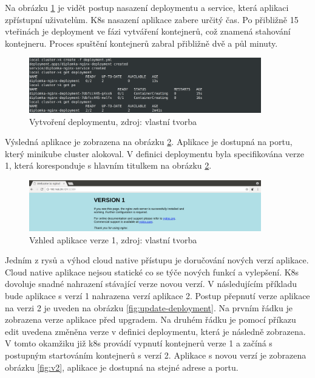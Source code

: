 Na obrázku \ref{fig:create-deployment} je vidět postup nasazení deploymentu a service, která aplikaci zpřístupní uživatelům. K8s nasazení aplikace zabere určitý čas. Po přibližně 15 vteřinách je deployment ve fázi vytváření kontejnerů, což znamená stahování kontejneru. Proces spuštění kontejnerů zabral přibližně dvě a půl minuty. 


\begin{figure}[H]
  \begin{centering}
    
	  \includegraphics[width=0.9\textwidth]{images/create-deployment.png}
    \par
	  \caption{Vytvoření deploymentu\label{fig:create-deployment}, zdroj: vlastní tvorba}
    \end{centering}
\end{figure}

Výsledná aplikace je zobrazena na obrázku \ref{fig:v1}. Aplikace je dostupná na portu, který minikube cluster alokoval. V definici deploymentu byla specifikována verze 1, která koresponduje s hlavním titulkem na obrázku \ref{fig:v1}.

\begin{figure}[H]
  \begin{centering}
    
	  \includegraphics[width=0.9\textwidth]{images/v1.png}
    \par
	  \caption{Vzhled aplikace verze 1\label{fig:v1}, zdroj: vlastní tvorba}
    \end{centering}
\end{figure}

Jedním z rysů a výhod cloud native přístupu je doručování nových verzí aplikace. Cloud native aplikace nejsou statické co se týče nových funkcí a vylepšení. K8s dovoluje snadné nahrazení stávající verze novou verzí. V následujícím příkladu bude aplikace \linebreak s verzí 1 nahrazena verzí aplikace 2. Postup přepnutí verze aplikace na verzi 2 je uveden na obrázku \ref{fig:update-deployment}. Na prvním řádku je zobrazena verze aplikace před upgradem. \linebreak Na druhém řádku je pomocí příkazu edit uvedena změněna verze v definici deploymentu, která je následně zobrazena. V tomto okamžiku již k8s provádí vypnutí kontejnerů verze 1 a začíná s postupným startováním kontejnerů s verzí 2. Aplikace s novou verzí je zobrazena obrázku \ref{fig:v2}, aplikace je dostupná na stejné adrese a portu.

